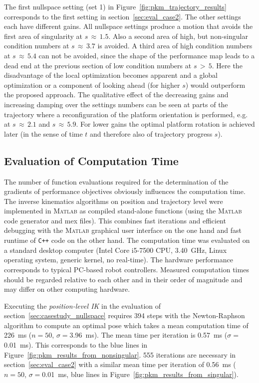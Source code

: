 \documentclass[a4paper,twoside]{article}
\begin{document}
The first nullspace setting (set 1) in Figure~\ref{fig:pkm_trajectory_results} corresponds to the first setting in section~\ref{sec:eval_case2}.
The other settings each have different gains.
All nullspace settings produce a motion that avoids the first area of singularity at $s\,{\approx}\,1.5$.
Also a second area of high, but non-singular condition numbers at $s\,{\approx}\,3.7$ is avoided.
A third area of high condition numbers at $s\,{\approx}\,5.4$ can not be avoided, since the shape of the performance map leads to a dead end at the previous section of low condition numbers at $s\,{>}\,5$.
Here the disadvantage of the local optimization becomes apparent and a global optimization or a component of looking ahead (for higher $s$) would outperform the proposed approach.
The qualitative effect of the decreasing gains and increasing damping over the settings numbers can be seen at parts of the trajectory where a reconfiguration of the platform orientation is performed, e.g. at $s\,{\approx}\,2.1$ and $s\,{\approx}\,5.9$.
For lower gains the optimal platform rotation is achieved later (in the sense of time $t$ and therefore also of trajectory progress $s$).


\subsection{Evaluation of Computation Time}
\label{sec:eval_comptime}

The number of function evaluations required for the determination of the gradients of performance objectives obviously influences the computation time.
The inverse kinematics algorithms on position and trajectory level were implemented in \textsc{Matlab} as compiled stand-alone functions (using the \textsc{Matlab} code generator and mex files).
This combines fast iterations and efficient debugging with the \textsc{Matlab} graphical user interface on the one hand and fast runtime of \texttt{C++} code on the other hand.
The computation time was evaluated on a standard desktop computer (Intel Core i5-7500 CPU, \SI{3.40}{\giga\hertz}, Linux operating system, generic kernel, no real-time).
The hardware performance corresponds to typical PC-based robot controllers.
Measured computation times should be regarded relative to each other and in their order of magnitude and may differ on other computing hardware.

Executing the \emph{position-level IK} in the evaluation of section~\ref{sec:casestudy_nullspace} requires 394 steps with the Newton-Raphson algorithm to compute an optimal pose which takes a mean computation time of \SI{226}{\milli\second} ($n{=}50$, $\sigma{=}$\SI{3.96}{\milli\second}).
The mean time per iteration is \SI{0.57}{\milli\second} ($\sigma{=}$\SI{0.01}{\milli\second}).
This corresponds to the blue lines in Figure~\ref{fig:pkm_results_from_nonsingular}.
555 iterations are necessary in section~\ref{sec:eval_case2}  with a similar mean time per iteration of \SI{0.56}{\milli\second} ($n{=}50$, $\sigma{=}$\SI{0.01}{\milli\second}, blue lines in Figure~\ref{fig:pkm_results_from_singular}).
\end{document}
